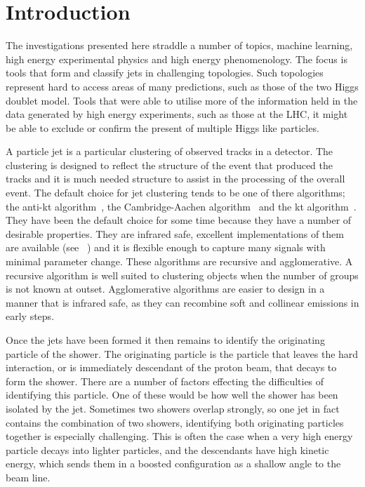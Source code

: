 \section{Introduction}
The investigations presented here straddle a number of topics, machine learning, high energy experimental physics and high energy phenomenology. 
The focus is tools that form and classify jets in challenging topologies.
Such topologies represent hard to access areas of many predictions, such as those of the two Higgs doublet model.
Tools that were able to utilise more of the information held in the data generated by high energy experiments, such as those at the LHC, it might be able to exclude or confirm the present of multiple Higgs like particles.

A particle jet is a particular clustering of observed tracks in a detector.
The clustering is designed to reflect the structure of the event that produced the tracks and it is much needed structure to assist in the processing of the overall event.
The default choice for jet clustering tends to be one of there algorithms;
the anti-kt algorithm~\cite{Cacciari2008akt}, the Cambridge-Aachen algorithm~\cite{Wobisch1998caJet} and the kt algorithm~\cite{Ellis1993ktJet}.
They have been the default choice for some time because they have a number of desirable properties.
They are infrared safe, excellent implementations of them are available (see \fastjet{}~\cite{Cacciari2011FastJet})
and it is flexible enough to capture many signals with minimal parameter change.
These algorithms are recursive and agglomerative.
A recursive algorithm is well suited to clustering objects when the number of groups is not known at outset.
Agglomerative algorithms are easier to design in a manner that is infrared safe,
as they can recombine soft and collinear emissions in early steps.

Once the jets have been formed it then remains to identify the originating particle of the shower.
The originating particle is the particle that leaves the hard interaction, or is immediately descendant of the proton beam,
that decays to form the shower.
There are a number of factors effecting the difficulties of identifying this particle.
One of these would be how well the shower has been isolated by the jet.
Sometimes two showers overlap strongly, so one jet in fact contains the combination of two showers,
identifying both originating particles together is especially challenging.
This is often the case when a very high energy particle decays into lighter particles,
and the descendants have high kinetic energy, which sends them in a boosted configuration as a shallow angle to the beam line.

